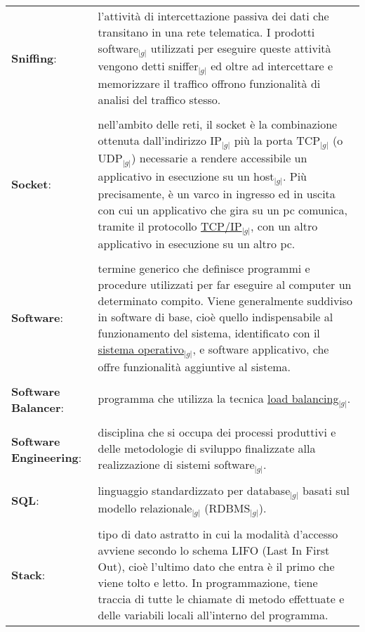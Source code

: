 \begin{longtable}{p{} p{}}
	    \\
	    \textbf{Sniffing}: 			&	l'attività di intercettazione passiva dei dati che transitano in una rete telematica. I prodotti software$_{|g|}$ utilizzati per eseguire queste attività vengono detti sniffer$_{|g|}$ ed oltre ad intercettare e memorizzare 
							il traffico offrono funzionalità di analisi del traffico stesso.\\
	    \\
	    \textbf{Socket}:			&	nell'ambito delle reti, il socket è la combinazione ottenuta dall'indirizzo IP$_{|g|}$ più la porta TCP$_{|g|}$ (o UDP$_{|g|}$) necessarie a rendere accessibile un applicativo in esecuzione su un host$_{|g|}$. 
							Più precisamente, è un varco in ingresso ed in uscita con cui un applicativo che gira su un pc comunica, tramite il protocollo \underline{TCP/IP}$_{|g|}$, con un altro applicativo in esecuzione su un altro pc.\\
	    \\
	    \textbf{Software}:			&	termine generico che definisce programmi e procedure utilizzati per far eseguire al computer un determinato compito. Viene generalmente suddiviso in software di base, cioè quello indispensabile 
							al funzionamento del sistema, identificato con il \underline{sistema operativo}$_{|g|}$, e software applicativo, che offre funzionalità aggiuntive al sistema.\\
	    \\
	    \textbf{Software} \newline
	    \textbf{Balancer}:			&	programma che utilizza la tecnica \underline{load balancing}$_{|g|}$.\\
	    \\
	    \textbf{Software} \newline
	    \textbf{Engineering}:		&	disciplina che si occupa dei processi produttivi e delle metodologie di sviluppo finalizzate alla realizzazione di sistemi software$_{|g|}$.\\
	    \\
	    \textbf{SQL}: 			&	linguaggio standardizzato per database$_{|g|}$ basati sul modello relazionale$_{|g|}$ (RDBMS$_{|g|}$).\\
	    \\
	    \textbf{Stack}:			&	tipo di dato astratto in cui la modalità d’accesso avviene secondo lo schema LIFO (Last In First Out), cioè l’ultimo dato che entra è il primo che viene tolto e letto. In programmazione, tiene 
							traccia di tutte le chiamate di metodo effettuate e delle variabili locali all’interno del programma.\\

\end{longtable}
